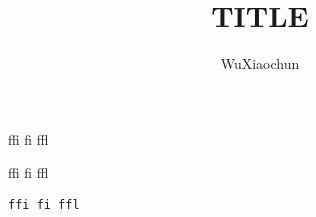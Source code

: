 ﻿\documentclass[a4paper,onecolumn]{article}
\title{TITLE}
\author{WuXiaochun}
\date{}
\begin{document}
{\Large
ffi fi ffl

\textsf{ffi fi ffl}

\texttt{ffi fi ffl}
}
\end{document}
